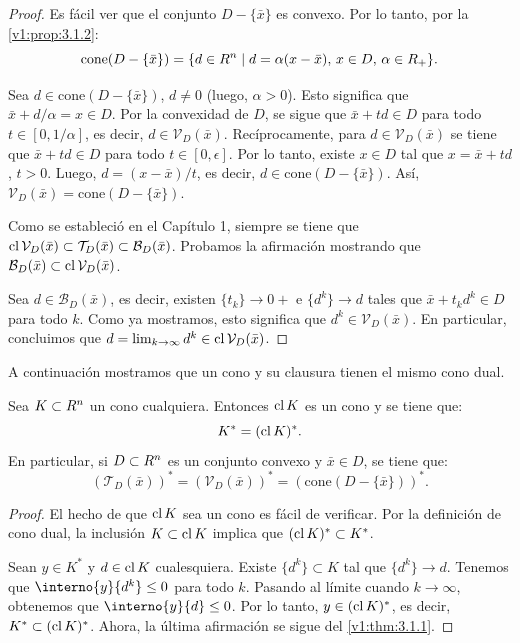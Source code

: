 \begin{proof}
 Es fácil ver que el conjunto $D - \{\bar{x}\}$ es convexo. Por lo tanto, por la \cref{v1:prop:3.1.2}:
 \begin{equation}
 \text{cone}(D - \{\bar{x}\}) = \{d \in R^n \mid d = \alpha(x - \bar{x}), \, x \in D, \, \alpha \in R_+\}. \label{v1:eq:3.1}
 \end{equation}
 
 Sea $d \in \text{cone}(D - \{\bar{x}\})$, $d \neq 0$ (luego, $\alpha > 0$). Esto significa que $\bar{x} + d/\alpha = x \in D$. Por la convexidad de $D$, se sigue que $\bar{x} + t d \in D$ para todo $t \in [0, 1/\alpha]$, es decir, $d \in \mathcal{V}_D(\bar{x})$. Recíprocamente, para $d \in \mathcal{V}_D(\bar{x})$ se tiene que $\bar{x} + td \in D$ para todo $t \in [0, \epsilon]$. Por lo tanto, existe $x \in D$ tal que $x = \bar{x} + td$, $t > 0$. Luego, $d = (x - \bar{x})/t$, es decir, $d \in \text{cone}(D - \{\bar{x}\})$. Así, $\mathcal{V}_D(\bar{x}) = \text{cone}(D - \{\bar{x}\})$.
 
 Como se estableció en el Capítulo 1, siempre se tiene que $\operatorname{cl} \mathcal{V}_D(\bar{x}) \subset \mathcal{T}_D(\bar{x}) \subset \mathcal{B}_D(\bar{x})$. Probamos la afirmación mostrando que $\mathcal{B}_D(\bar{x}) \subset \operatorname{cl} \mathcal{V}_D(\bar{x})$.
 
 Sea $d \in \mathcal{B}_D(\bar{x})$, es decir, existen $\{t_k\} \to 0+$ e $\{d^k\} \to d$ tales que $\bar{x} + t_k d^k \in D$ para todo $k$. Como ya mostramos, esto significa que $d^k \in \mathcal{V}_D(\bar{x})$. En particular, concluimos que $d = \lim_{k\to\infty} d^k \in \operatorname{cl} \mathcal{V}_D(\bar{x})$.
\end{proof}

A continuación mostramos que un cono y su clausura tienen el mismo cono dual.

\begin{proposition}\label{v1:prop:3.1.3}
 Sea $K \subset R^n$ un cono cualquiera. Entonces $\operatorname{cl} K$ es un cono y se tiene que:
 \[
 K^* = (\operatorname{cl} K)^*.
 \]
 En particular, si $D \subset R^n$ es un conjunto convexo y $\bar{x} \in D$, se tiene que:
 \[
 (\mathcal{T}_D(\bar{x}))^* = (\mathcal{V}_D(\bar{x}))^* = (\text{cone}(D - \{\bar{x}\}))^*.
 \]
\end{proposition}

\begin{proof}
 El hecho de que $\operatorname{cl} K$ sea un cono es fácil de verificar. Por la definición de cono dual, la inclusión $K \subset \operatorname{cl} K$ implica que $(\operatorname{cl} K)^* \subset K^*$.
 
 Sean $y \in K^*$ y $d \in \operatorname{cl} K$ cualesquiera. Existe $\{d^k\} \subset K$ tal que $\{d^k\} \to d$. Tenemos que $\interno{y}{d^k} \leq 0$ para todo $k$. Pasando al límite cuando $k \to \infty$, obtenemos que $\interno{y}{d} \leq 0$. Por lo tanto, $y \in (\operatorname{cl} K)^*$, es decir, $K^* \subset (\operatorname{cl} K)^*$. Ahora, la última afirmación se sigue del \cref{v1:thm:3.1.1}.
\end{proof}

